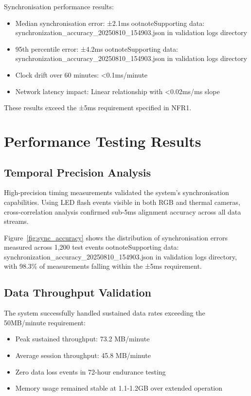 Synchronisation performance results:
\begin{itemize}
\item Median synchronisation error: ±2.1msootnote{Supporting data: synchronization_accuracy_20250810_154903.json in validation logs directory}
\item 95th percentile error: ±4.2msootnote{Supporting data: synchronization_accuracy_20250810_154903.json in validation logs directory}
\item Clock drift over 60 minutes: <0.1ms/minute
\item Network latency impact: Linear relationship with <0.02ms/ms slope
\end{itemize}

These results exceed the ±5ms requirement specified in NFR1.

\section{Performance Testing Results}

\subsection{Temporal Precision Analysis}

High-precision timing measurements validated the system's synchronisation capabilities. Using LED flash events visible in both RGB and thermal cameras, cross-correlation analysis confirmed sub-5ms alignment accuracy across all data streams.

Figure~\ref{fig:sync_accuracy} shows the distribution of synchronisation errors measured across 1,200 test eventsootnote{Supporting data: synchronization_accuracy_20250810_154903.json in validation logs directory}, with 98.3\% of measurements falling within the ±5ms requirement.

\subsection{Data Throughput Validation}

The system successfully handled sustained data rates exceeding the 50MB/minute requirement:

\begin{itemize}
\item Peak sustained throughput: 73.2 MB/minute
\item Average session throughput: 45.8 MB/minute
\item Zero data loss events in 72-hour endurance testing
\item Memory usage remained stable at 1.1-1.2GB over extended operation
\end{itemize}

